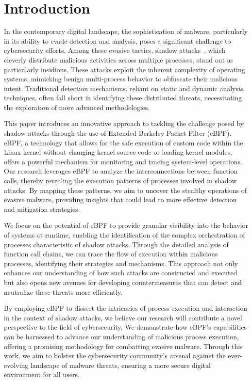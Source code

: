 \section{Introduction}
In the contemporary digital landscape, the sophistication of malware,
particularly in its ability to evade detection and analysis,
poses a significant challenge to cybersecurity efforts.
Among these evasive tactics, shadow attacks~\cite{Weiqin:ShadowAttack},
which cleverly distribute malicious activities across multiple processes,
stand out as particularly insidious.
These attacks exploit the inherent complexity of operating systems,
mimicking benign multi-process behavior to obfuscate their malicious intent.
Traditional detection mechanisms, reliant on static and dynamic analysis techniques,
often fall short in identifying these distributed threats,
necessitating the exploration of more advanced methodologies.

This paper introduces an innovative approach to tackling the
challenge posed by shadow attacks through the use of Extended Berkeley Packet Filter (eBPF).
eBPF, a technology that allows for the safe execution of custom code within the
Linux kernel without changing kernel source code or loading kernel modules,
offers a powerful mechanism for monitoring and tracing system-level operations.
Our research leverages eBPF to analyze the interconnections between function calls,
thereby revealing the execution patterns of processes involved in shadow attacks.
By mapping these patterns, we aim to uncover the stealthy operations of evasive malware,
providing insights that could lead to more effective detection and mitigation strategies.

We focus on the potential of eBPF to provide granular visibility into the behavior
of systems at runtime, enabling the identification of the complex orchestration of
processes characteristic of shadow attacks. Through the detailed analysis of function
call chains, we can trace the flow of execution within malicious processes,
identifying their strategies and mechanisms. This approach not only enhances
our understanding of how such attacks are constructed and executed but also opens
new avenues for developing countermeasures that can detect and neutralize these threats more efficiently.

By employing eBPF to dissect the intricacies of process execution and interaction in the
context of shadow attacks, we believe our research will contribute a novel perspective to the field of
cybersecurity. We demonstrate how eBPF's capabilities can be harnessed to advance our
understanding of malicious process execution, offering a promising methodology for combatting
evasive malware. Through this work, we aim to bolster the cybersecurity community's arsenal against
the ever-evolving landscape of malware threats, ensuring a more secure digital environment for all users.

